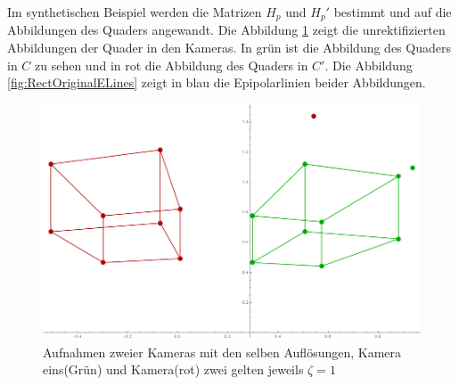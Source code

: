 Im synthetischen Beispiel werden die Matrizen $H_p$ und $H_p'$ bestimmt und auf die Abbildungen des Quaders angewandt. Die Abbildung \ref{fig:RectOriginal} zeigt die unrektifizierten Abbildungen der Quader in den Kameras. In grün ist die Abbildung des Quaders in $C$ zu sehen und in rot die Abbildung des Quaders in $C'$. Die Abbildung \ref{fig:RectOriginalELines} zeigt in blau die Epipolarlinien beider Abbildungen. 





\begin{figure}[!htb]
	\centering
	\includegraphics[width=.8\linewidth]{images/Rectification_one_same_Solutions.png}
	\caption[virtuelle Aufnahme eines Quaders für die Rektifizierung]{Aufnahmen zweier Kameras mit den selben Auflösungen, Kamera eins(Grün) und Kamera(rot) zwei gelten jeweils \ensuremath{\zeta =1}}
	\label{fig:RectOriginal} 
\end{figure}
\pagebreak


